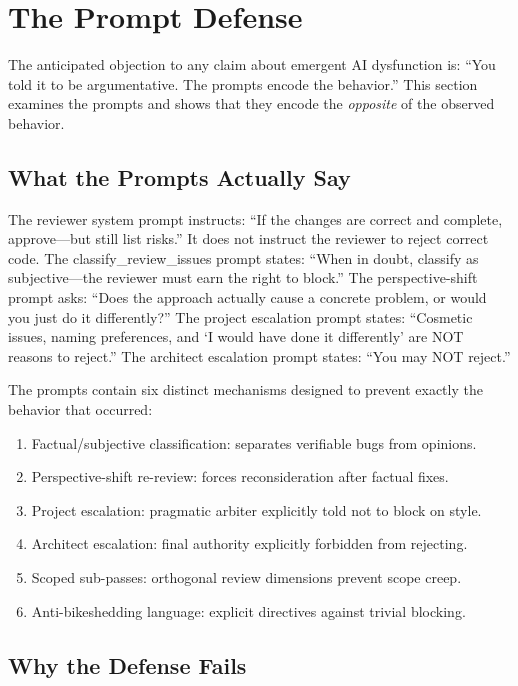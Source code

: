 \documentclass[11pt,a4paper]{article}
\begin{document}
\section{The Prompt Defense}
\label{sec:defense}

The anticipated objection to any claim about emergent AI dysfunction is: ``You told it to be argumentative. The prompts encode the behavior.'' This section examines the prompts and shows that they encode the \emph{opposite} of the observed behavior.

\subsection{What the Prompts Actually Say}

The reviewer system prompt instructs: ``If the changes are correct and complete, approve---but still list risks.'' It does not instruct the reviewer to reject correct code. The classify\_review\_issues prompt states: ``When in doubt, classify as subjective---the reviewer must earn the right to block.'' The perspective-shift prompt asks: ``Does the approach actually cause a concrete problem, or would you just do it differently?'' The project escalation prompt states: ``Cosmetic issues, naming preferences, and `I would have done it differently' are NOT reasons to reject.'' The architect escalation prompt states: ``You may NOT reject.''

The prompts contain six distinct mechanisms designed to prevent exactly the behavior that occurred:

\begin{enumerate}
\item Factual/subjective classification: separates verifiable bugs from opinions.
\item Perspective-shift re-review: forces reconsideration after factual fixes.
\item Project escalation: pragmatic arbiter explicitly told not to block on style.
\item Architect escalation: final authority explicitly forbidden from rejecting.
\item Scoped sub-passes: orthogonal review dimensions prevent scope creep.
\item Anti-bikeshedding language: explicit directives against trivial blocking.
\end{enumerate}

\subsection{Why the Defense Fails}
\end{document}
